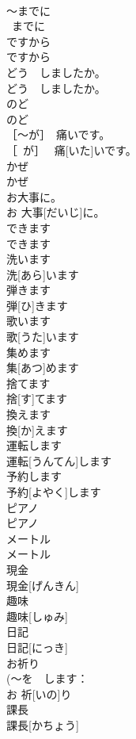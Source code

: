 \documentclass[8pt]{extreport}
\begin{document}
\begin{CJK}{UTF8}{min}
\\	～までに	
\\	~までに	
\\	ですから	
\\	ですから	
\\	どう　しましたか。	
\\	どう　しましたか。	
\\	のど	
\\	のど	
\\	［～が］　痛いです。	
\\	［~が］　 痛[いた]いです。	
\\	かぜ	
\\	かぜ	
\\	お大事に。	
\\	お 大事[だいじ]に。	
\\	できます	
\\	できます	
\\	洗います	
\\	洗[あら]います	
\\	弾きます	
\\	弾[ひ]きます	
\\	歌います	
\\	歌[うた]います	
\\	集めます	
\\	集[あつ]めます	
\\	捨てます	
\\	捨[す]てます	
\\	換えます	
\\	換[か]えます	
\\	運転します	
\\	運転[うんてん]します	
\\	予約します	
\\	予約[よやく]します	
\\	ピアノ	
\\	ピアノ	
\\	メートル	
\\	メートル	
\\	現金	
\\	現金[げんきん]	
\\	趣味	
\\	趣味[しゅみ]	
\\	日記	
\\	日記[にっき]	
\\	お祈り	
\\	(～を　します：
\\	お 祈[いの]り	
\\	課長	
\\	課長[かちょう]	

\end{CJK}
\end{document}
